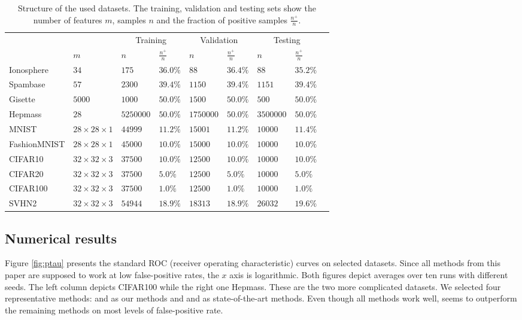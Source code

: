 \begin{table}[!ht]
  \centering
  \begin{tabular}{@{}lllllllll@{}}
    \toprule
    &  & \multicolumn{2}{c}{Training} & \multicolumn{2}{c}{Validation} & \multicolumn{2}{c}{Testing} \\ \cmidrule(lr){3-4} \cmidrule(lr){5-6} \cmidrule(l){7-8} 
    & $m$ & $n$ & $\frac{n^+}{n}$ & $n$ & $\frac{n^+}{n}$ & $n$ & $\frac{n^+}{n}$ \\ \midrule
    Ionosphere
      & $34$
      & $175$ & $36.0\%$ & $88$ & $36.4\%$ & $88$ & $35.2\%$ \\
    Spambase
      & $57$
      & $2300$ & $39.4\%$ & $1150$ & $39.4\%$ & $1151$ & $39.4\%$ \\
    Gisette
      & $5000$
      & $1000$ & $50.0\%$ & $1500$ & $50.0\%$ & $500$ & $50.0\%$ \\
    Hepmass
      & $28$
      & $5250000$ & $50.0\%$ & $1750000$ & $50.0\%$ & $3500000$ & $50.0\%$ \\
    MNIST
      & $28 \times 28 \times 1$
      & $44999$ & $11.2\%$ & $15001$ & $11.2\%$ & $10000$ & $11.4\%$ \\
    FashionMNIST
      & $28 \times 28\times 1$
      & $45000$ & $10.0\%$ & $15000$ & $10.0\%$ & $10000$ & $10.0\%$ \\
    CIFAR10
      & $32\times 32\times 3$
      & $37500$ & $10.0\%$ & $12500$ & $10.0\%$ & $10000$ & $10.0\%$ \\
    CIFAR20
      & $32 \times 32\times 3$
      & $37500$ & $5.0\%$ & $12500$ & $5.0\%$ & $10000$ & $5.0\%$ \\
    CIFAR100
      & $32 \times 32\times 3$
      & $37500$ & $1.0\%$ & $12500$ & $1.0\%$ & $10000$ & $1.0\%$ \\
    SVHN2
      & $32 \times 32\times 3$
      & $54944$ & $18.9\%$ & $18313$ & $18.9\%$ & $26032$ & $19.6\%$ \\
    \bottomrule
  \end{tabular}
  \caption{Structure of the used datasets. The training, validation and testing sets show the number of features $m$, samples $n$ and the fraction of positive samples $\frac{n^+}{n}$.}
  \label{tab:counts}
\end{table}

\subsection{Numerical results}

Figure \ref{fig:ptau} presents the standard ROC (receiver operating characteristic) curves on selected datasets. Since all methods from this paper are supposed to work at low false-positive rates, the $x$ axis is logarithmic. Both figures depict averages over ten runs with different seeds. The left column depicts CIFAR100 while the right one Hepmass. These are the two more complicated datasets. We selected four representative methods: \PatMat and \PatMatNP as our methods and \TopPush and \tauFPL as state-of-the-art methods. Even though all methods work well, \PatMatNP seems to outperform the remaining methods on most levels of false-positive rate.

